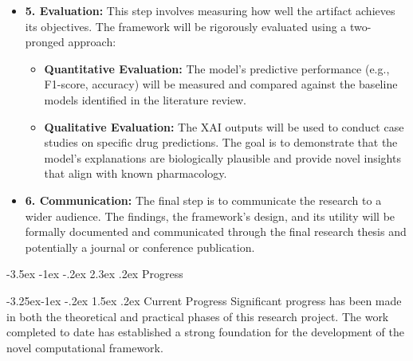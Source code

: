\documentclass[12pt,a4paper]{article}
\makeatletter
\renewcommand\section{\@startsection{section}{1}{\z@}%
  {-3.5ex \@plus-1ex \@minus-.2ex}%
  {2.3ex \@plus.2ex}%
  {\normalfont\large\bfseries}}
\renewcommand\subsection{\@startsection{subsection}{2}{\z@}%
  {-3.25ex\@plus-1ex \@minus-.2ex}%
  {1.5ex \@plus.2ex}%
  {\normalfont\normalsize\bfseries}}
\makeatother
\begin{document}
\begin{itemize}
    \item \textbf{5. Evaluation:} This step involves measuring how well the artifact achieves its objectives. The framework will be rigorously evaluated using a two-pronged approach:
        \begin{itemize}
            \item \textbf{Quantitative Evaluation:} The model's predictive performance (e.g., F1-score, accuracy) will be measured and compared against the baseline models identified in the literature review.
            \item \textbf{Qualitative Evaluation:} The XAI outputs will be used to conduct case studies on specific drug predictions. The goal is to demonstrate that the model's explanations are biologically plausible and provide novel insights that align with known pharmacology.
        \end{itemize}

    \item \textbf{6. Communication:} The final step is to communicate the research to a wider audience. The findings, the framework's design, and its utility will be formally documented and communicated through the final research thesis and potentially a journal or conference publication.
\end{itemize}

\section{Progress}

\subsection{Current Progress}
Significant progress has been made in both the theoretical and practical phases of this research project. The work completed to date has established a strong foundation for the development of the novel computational framework.
\end{document}
